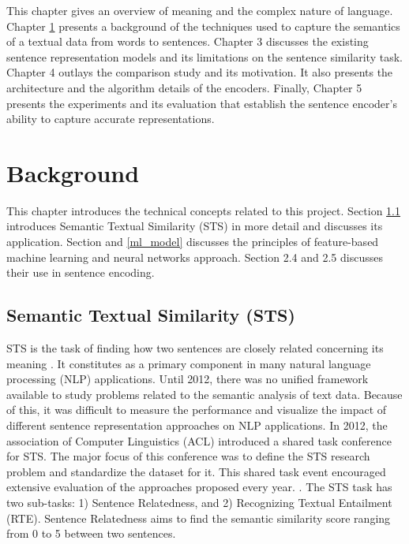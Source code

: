 \documentclass[12pt]{report} %
\begin{document}
	This chapter gives an overview of meaning and the complex nature of language. Chapter \ref{background} presents a background of the techniques used to capture the semantics of a textual data from words to sentences. Chapter 3 discusses the existing sentence representation models and its limitations on the sentence similarity task. Chapter 4  outlays the comparison study and its motivation. It also presents the architecture and the algorithm details of the encoders. Finally, Chapter 5 presents the experiments and its evaluation that establish the sentence encoder's ability to capture accurate representations.
	
	

\chapter{Background}
\label{background}
This chapter introduces the technical concepts related to this project. Section \ref{sts} introduces Semantic Textual Similarity (STS) in
more detail and discusses its application. Section \label{history} and \ref{ml_model} discusses the
principles of feature-based machine learning and neural networks approach. Section 2.4 and 2.5 discusses their use in sentence encoding.


\section{Semantic Textual Similarity (STS)}
\label{sts}

     STS is the task of finding how two sentences are closely related concerning its meaning \citep{agirre2012semeval}. It constitutes as a primary component in many natural language processing (NLP) applications. Until 2012, there was no unified framework available to study problems related to the semantic analysis of text data. Because of this, it was difficult to measure the performance and visualize the impact of different sentence representation approaches on NLP applications. In 2012, the association of Computer Linguistics (ACL) introduced a shared task conference for STS. The major focus of this conference was to define the STS research problem and standardize the dataset for it. This shared task event encouraged extensive evaluation of the approaches proposed every year. \citep{agirre2012semeval}. The STS task has two sub-tasks: 1) Sentence Relatedness, and 2) Recognizing Textual Entailment (RTE). Sentence Relatedness aims to find the semantic similarity score ranging from 0 to 5 between two sentences. 
    
\end{document}
